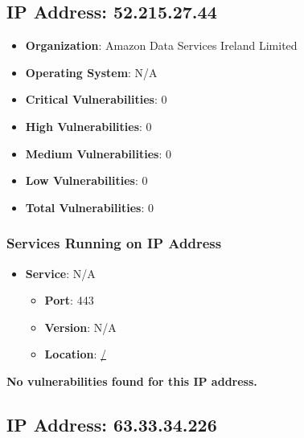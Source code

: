 \documentclass{article}
\begin{document}
\begin{itemize}
\end{itemize}




\clearpage



\subsection*{IP Address: 52.215.27.44}

\begin{itemize}
    \item \textbf{Organization}: Amazon Data Services Ireland Limited
    \item \textbf{Operating System}:  N/A 
    \item \textbf{Critical Vulnerabilities}: 0
    \item \textbf{High Vulnerabilities}: 0
    \item \textbf{Medium Vulnerabilities}: 0
    \item \textbf{Low Vulnerabilities}: 0
    \item \textbf{Total Vulnerabilities}: 0
\end{itemize}

\subsubsection*{Services Running on IP Address}

\begin{itemize}
    
        \item \textbf{Service}: N/A
        \begin{itemize}
            \item \textbf{Port}: 443
            \item \textbf{Version}:  N/A 
            \item \textbf{Location}: \href{ / }{ / }
        \end{itemize}
    
\end{itemize}


\textbf{No vulnerabilities found for this IP address.}




\clearpage



\subsection*{IP Address: 63.33.34.226}
\end{document}
